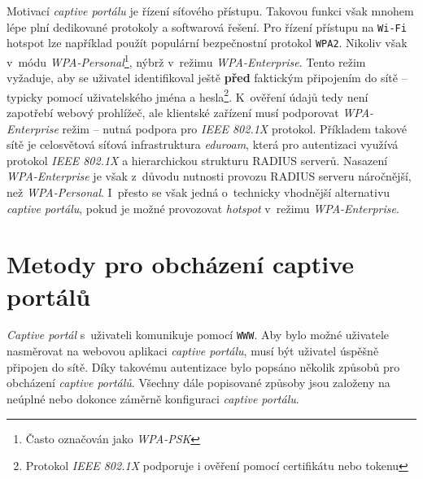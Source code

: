 \documentclass[thesis=M,czech]{FITthesis}[2012/10/20]
\begin{document}
Motivací \textit{captive portálu} je řízení síťového přístupu. Takovou funkci však mnohem lépe\cite{bakalarka-srovnani-captive-fwall-nac} plní dedikované protokoly a softwarová řešení. Pro řízení přístupu na \texttt{Wi-Fi} hotspot lze například použít populární bezpečnostní protokol \texttt{WPA2}. Nikoliv však v~módu \textit{WPA-Personal}\footnote{Často označován jako \textit{WPA-PSK}}, nýbrž v~režimu \textit{WPA-Enterprise}. Tento režim vyžaduje, aby se uživatel identifikoval ještě \textbf{před} faktickým připojením do sítě -- typicky pomocí uživatelského jména a hesla\footnote{Protokol \textit{IEEE 802.1X} podporuje i ověření pomocí certifikátu nebo tokenu}. K~ověření údajů tedy není zapotřebí webový prohlížeč, ale klientské zařízení musí podporovat \textit{WPA-Enterprise} režim -- nutná podpora pro \textit{IEEE 802.1X} protokol. Příkladem takové sítě je celosvětová síťová infrastruktura \textit{eduroam}, která pro autentizaci využívá protokol \textit{IEEE 802.1X} a hierarchickou strukturu RADIUS serverů. Nasazení \textit{WPA-Enterprise} je však z~důvodu nutnosti provozu RADIUS serveru náročnější, než \textit{WPA-Personal}. I~přesto se však jedná o~technicky vhodnější alternativu \textit{captive portálu}, pokud je možné provozovat \textit{hotspot} v~režimu \textit{WPA-Enterprise}.




\section{Metody pro obcházení captive portálů}
\label{sec:metody-obchazeni-captive-portalu}

\textit{Captive portál} s~uživateli komunikuje pomocí \texttt{WWW}. Aby bylo možné uživatele nasměrovat na webovou aplikaci \textit{captive portálu}, musí být uživatel úspěšně připojen do sítě. Díky takovému  autentizace bylo popsáno několik způsobů pro obcházení \textit{captive portálů}. Všechny dále popisované způsoby jsou založeny na neúplné nebo dokonce záměrně  konfiguraci \textit{captive portálu}.
\end{document}
